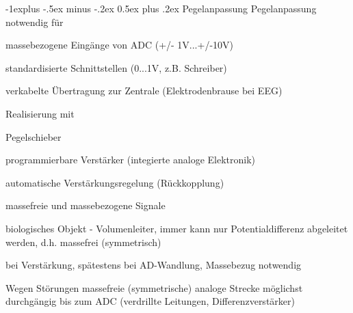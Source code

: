 \documentclass[a4paper]{article}
\makeatletter
\renewcommand{\subsection}{\@startsection{subsection}{2}{0mm}%
 {-1explus -.5ex minus -.2ex}%
 {0.5ex plus .2ex}%
 {\normalfont\normalsize\bfseries}}
\makeatother
\begin{document}
\begin{multicols}{3}
  \subsection{Pegelanpassung}\label{pegelanpassung}
  Pegelanpassung notwendig für
  \begin{itemize*}
    \item massebezogene Eingänge von ADC (+/- 1V...+/-10V)
    \item standardisierte Schnittstellen (0...1V, z.B. Schreiber)
    \item verkabelte Übertragung zur Zentrale (Elektrodenbrause bei EEG)
  \end{itemize*}

  Realisierung mit
  \begin{itemize*}
    \item Pegelschieber
    \item programmierbare Verstärker (integierte analoge Elektronik)
    \item automatische Verstärkungsregelung (Rückkopplung)
  \end{itemize*}

  massefreie und massebezogene Signale
  \begin{itemize*}
    \item biologisches Objekt - Volumenleiter, immer kann nur Potentialdifferenz abgeleitet werden, d.h. massefrei (symmetrisch)
    \item bei Verstärkung, spätestens bei AD-Wandlung, Massebezug notwendig
    \item Wegen Störungen massefreie (symmetrische) analoge Strecke möglichst durchgängig bis zum ADC (verdrillte Leitungen, Differenzverstärker)
  \end{itemize*}


\end{multicols}
\end{document}
